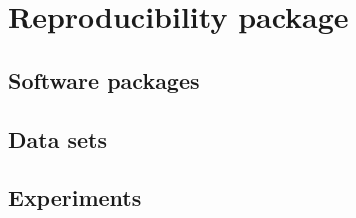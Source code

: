 \chapter{Reproducibility package}
\label{ch:repr}

\section{Software packages}

\section{Data sets}

\section{Experiments}